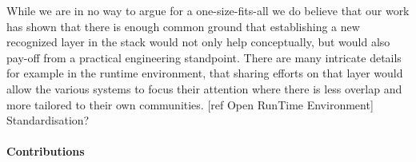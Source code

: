\documentclass{sig-alternate}
\begin{document}
While we are in no way to argue for a one-size-fits-all \pilot we do believe
that our work has shown that there is enough common ground that establishing a
new recognized layer in the stack would not only help conceptually, but would
also pay-off from a practical engineering standpoint.
There are many intricate details for example in the runtime environment, that
sharing efforts on that layer would allow the various systems to focus their
attention where there is less overlap and more tailored to their own
communities. [ref Open RunTime Environment] Standardisation?

\paragraph*{Contributions} 



\end{document}
